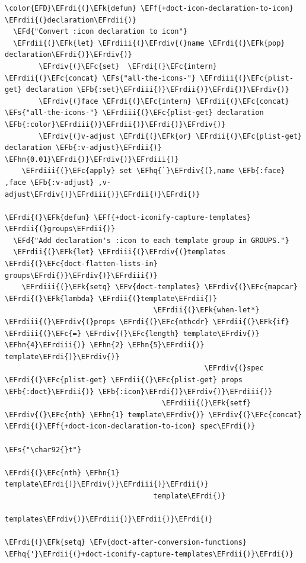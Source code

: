 \documentclass{scrartcl}
\newcommand{\EFk}[1]{\textcolor{EFk}{#1}} %
\newcommand{\EFd}[1]{\textcolor{EFd}{\textit{#1}}} %
\newcommand{\EFs}[1]{\textcolor{EFs}{#1}} %
\newcommand{\EFb}[1]{\textcolor{EFb}{#1}} %
\newcommand{\EFc}[1]{\textcolor{EFc}{#1}} %
\newcommand{\EFv}[1]{\textcolor{EFv}{#1}} %
\newcommand{\EFf}[1]{\textcolor{EFf}{#1}} %
\newcommand{\EFhn}[1]{\textcolor{EFhn}{\textbf{#1}}} %
\newcommand{\EFhq}[1]{\textcolor{EFhq}{#1}} %
\newcommand{\EFrdi}[1]{\textcolor{EFrdi}{#1}} %
\newcommand{\EFrdii}[1]{\textcolor{EFrdii}{#1}} %
\newcommand{\EFrdiii}[1]{\textcolor{EFrdiii}{#1}} %
\newcommand{\EFrdiv}[1]{\textcolor{EFrdiv}{#1}} %
\begin{document}
\begin{Code}
\begin{Verbatim}[]
\color{EFD}\EFrdi{(}\EFk{defun} \EFf{+doct-icon-declaration-to-icon} \EFrdii{(}declaration\EFrdii{)}
  \EFd{"Convert :icon declaration to icon"}
  \EFrdii{(}\EFk{let} \EFrdiii{(}\EFrdiv{(}name \EFrdi{(}\EFk{pop} declaration\EFrdi{)}\EFrdiv{)}
        \EFrdiv{(}\EFc{set}  \EFrdi{(}\EFc{intern} \EFrdii{(}\EFc{concat} \EFs{"all-the-icons-"} \EFrdiii{(}\EFc{plist-get} declaration \EFb{:set}\EFrdiii{)}\EFrdii{)}\EFrdi{)}\EFrdiv{)}
        \EFrdiv{(}face \EFrdi{(}\EFc{intern} \EFrdii{(}\EFc{concat} \EFs{"all-the-icons-"} \EFrdiii{(}\EFc{plist-get} declaration \EFb{:color}\EFrdiii{)}\EFrdii{)}\EFrdi{)}\EFrdiv{)}
        \EFrdiv{(}v-adjust \EFrdi{(}\EFk{or} \EFrdii{(}\EFc{plist-get} declaration \EFb{:v-adjust}\EFrdii{)} \EFhn{0.01}\EFrdi{)}\EFrdiv{)}\EFrdiii{)}
    \EFrdiii{(}\EFc{apply} set \EFhq{`}\EFrdiv{(},name \EFb{:face} ,face \EFb{:v-adjust} ,v-adjust\EFrdiv{)}\EFrdiii{)}\EFrdii{)}\EFrdi{)}

\EFrdi{(}\EFk{defun} \EFf{+doct-iconify-capture-templates} \EFrdii{(}groups\EFrdii{)}
  \EFd{"Add declaration's :icon to each template group in GROUPS."}
  \EFrdii{(}\EFk{let} \EFrdiii{(}\EFrdiv{(}templates \EFrdi{(}\EFc{doct-flatten-lists-in} groups\EFrdi{)}\EFrdiv{)}\EFrdiii{)}
    \EFrdiii{(}\EFk{setq} \EFv{doct-templates} \EFrdiv{(}\EFc{mapcar} \EFrdi{(}\EFk{lambda} \EFrdii{(}template\EFrdii{)}
                                   \EFrdii{(}\EFk{when-let*} \EFrdiii{(}\EFrdiv{(}props \EFrdi{(}\EFc{nthcdr} \EFrdii{(}\EFk{if} \EFrdiii{(}\EFc{=} \EFrdiv{(}\EFc{length} template\EFrdiv{)} \EFhn{4}\EFrdiii{)} \EFhn{2} \EFhn{5}\EFrdii{)} template\EFrdi{)}\EFrdiv{)}
                                               \EFrdiv{(}spec \EFrdi{(}\EFc{plist-get} \EFrdii{(}\EFc{plist-get} props \EFb{:doct}\EFrdii{)} \EFb{:icon}\EFrdi{)}\EFrdiv{)}\EFrdiii{)}
                                     \EFrdiii{(}\EFk{setf} \EFrdiv{(}\EFc{nth} \EFhn{1} template\EFrdiv{)} \EFrdiv{(}\EFc{concat} \EFrdi{(}\EFf{+doct-icon-declaration-to-icon} spec\EFrdi{)}
                                                                    \EFs{"\char92{}t"}
                                                                    \EFrdi{(}\EFc{nth} \EFhn{1} template\EFrdi{)}\EFrdiv{)}\EFrdiii{)}\EFrdii{)}
                                   template\EFrdi{)}
                                 templates\EFrdiv{)}\EFrdiii{)}\EFrdii{)}\EFrdi{)}

\EFrdi{(}\EFk{setq} \EFv{doct-after-conversion-functions} \EFhq{'}\EFrdii{(}+doct-iconify-capture-templates\EFrdii{)}\EFrdi{)}
\end{Verbatim}
\end{Code}
\end{document}
